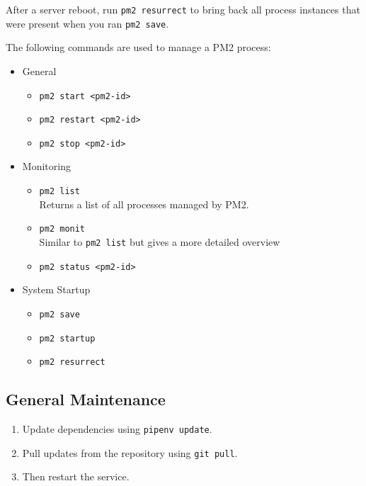 After a server reboot, run \texttt{pm2 resurrect} to bring back all process instances that were present when you ran \texttt{pm2 save}.

The following commands are used to manage a PM2 process:
\begin{itemize}
	\item
	{
		General
		\begin{itemize}
			\item
			{
				\texttt{pm2 start <pm2-id>}
			}
			\item
			{
				\texttt{pm2 restart <pm2-id>}
			}
			\item
			{
				\texttt{pm2 stop <pm2-id>}
			}
		\end{itemize}
	}
	\item
	{
		Monitoring 
		\begin{itemize}
			\item
			{
				\texttt{pm2 list}
				\\Returns a list of all processes managed by PM2.
			}
			\item
			{
				\texttt{pm2 monit}
				\\Similar to \texttt{pm2 list} but gives a more detailed overview
			}
			\item
			{
				\texttt{pm2 status <pm2-id>}
			}
		\end{itemize}
	}
	\item
	{
		System Startup 
		\begin{itemize}
			\item
			{
				\texttt{pm2 save}
			}
			\item
			{
				\texttt{pm2 startup}
			}
			\item
			{
				\texttt{pm2 resurrect}
			}
		\end{itemize}
	}
\end{itemize}



\pagebreak
\subsection{General Maintenance}
\begin{enumerate}
	\item{Update dependencies using \texttt{pipenv update}.}
	\item{Pull updates from the repository using \texttt{git pull}.}
	\item{Then restart the service.}
\end{enumerate}
	
